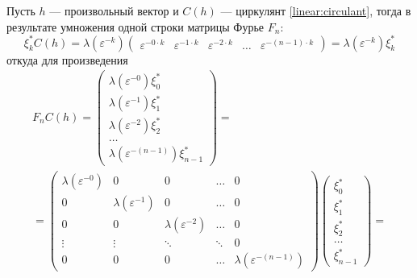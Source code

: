 Пусть $h$ --- произвольный вектор и $C(h)$ --- циркулянт \eqref{linear:circulant}, тогда в результате умножения одной строки матрицы Фурье $F_n$:
\[
    \xi_k^* C(h)
    = \lambda ( \varepsilon^{-k} ) \begin{pmatrix}
                                       \varepsilon^{- 0 \cdot k} & \varepsilon^{- 1 \cdot k} & \varepsilon^{- 2 \cdot k} & \dots & \varepsilon^{- (n-1) \cdot k}
    \end{pmatrix}
    = \lambda ( \varepsilon^{-k} ) \xi_k^*
\]
откуда для произведения
\begin{multline*}
    F_n C(h)
    =
    \begin{pmatrix}
        \lambda ( \varepsilon^{-0} ) \xi_0^* \\
        \lambda ( \varepsilon^{-1} ) \xi_1^* \\
        \lambda ( \varepsilon^{-2} ) \xi_2^* \\
        \dots                                \\
        \lambda ( \varepsilon^{-(n-1)} ) \xi_{n-1}^*
    \end{pmatrix} = \\
    =
    \begin{pmatrix}
        \lambda ( \varepsilon^{-0} ) & 0                            & 0                            & \dots  & 0                                \\
        0                            & \lambda ( \varepsilon^{-1} ) & 0                            & \dots  & 0                                \\
        0                            & 0                            & \lambda ( \varepsilon^{-2} ) & \dots  & 0                                \\
        \vdots                       & \vdots                       & \ddots                       & \ddots & 0                                \\
        0                            & 0                            & 0                            & \dots  & \lambda ( \varepsilon^{-(n-1)} )
    \end{pmatrix}
    \begin{pmatrix}
        \xi_0^* \\
        \xi_1^* \\
        \xi_2^* \\
        \dots   \\
        \xi_{n-1}^*
    \end{pmatrix}
    = \\

\end{multline*}
